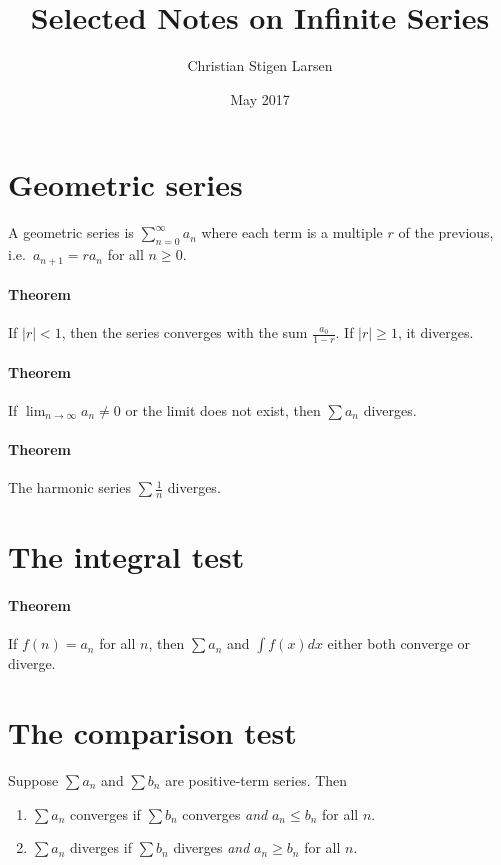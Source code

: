 \documentclass[a4paper,twocolumn,10pt]{article}
\title{Selected Notes on Infinite Series}
\author{Christian Stigen Larsen}
\date{May 2017}
\begin{document}
  \maketitle
  \section*{Geometric series}
  A geometric series is $\sum_{n=0}^{\infty} a_n$ where each term is a multiple
  $r$ of the previous, i.e.~$a_{n+1} = ra_n$ for all $n \geq 0$.

  \paragraph{Theorem} If $|r| < 1$, then the series converges with the sum
  $\frac{a_0}{1-r}$. If $|r| \geq 1$, it diverges.

  \paragraph{Theorem} If $\lim_{n\to\infty}{a_n}\neq 0$ or the limit does not
  exist, then $\sum a_n$ diverges.

  \paragraph{Theorem} The harmonic series $\sum \frac{1}{n}$ diverges.

  \section*{The integral test}

  \paragraph{Theorem} If $f(n) = a_n$ for all $n$, then $\sum a_n$ and $\int
  f(x) dx$ either both converge or diverge.

  \section*{The comparison test}
  Suppose $\sum a_n$ and $\sum b_n$ are positive-term series. Then
  \begin{enumerate}
    \item $\sum a_n$ converges if $\sum b_n$ converges \textit{and} $a_n \leq
      b_n$ for all $n$.
    \item $\sum a_n$ diverges if $\sum b_n$ diverges \textit{and} $a_n \geq
      b_n$ for all $n$.
  \end{enumerate}
\end{document}
